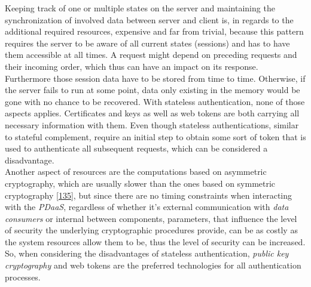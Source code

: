 \documentclass[12pt,english,a4paper,titlepage,cleardoublepage=empty,dottedtoc]{report}
\begin{document}
Keeping track of one or multiple states on the server and maintaining
the synchronization of involved data between server and client is, in
regards to the additional required resources, expensive and far from
trivial, because this pattern requires the server to be aware of all
current states (sessions) and has to have them accessible at all times.
A request might depend on preceding requests and their incoming order,
which thus can have an impact on its response. Furthermore those session
data have to be stored from time to time. Otherwise, if the server fails
to run at some point, data only existing in the memory would be gone
with no chance to be recovered. With stateless authentication, none of
those aspects applies. Certificates and keys as well as web tokens are
both carrying all necessary information with them. Even though stateless
authentications, similar to stateful complement, require an initial step
to obtain some sort of token that is used to authenticate all subsequent
requests, which can be considered a disadvantage.\\
Another aspect of resources are the computations based on asymmetric
cryptography, which are usually slower than the ones based on symmetric
cryptography
{[}\protect\hyperlink{ref-book_2014_chapter-10-5-asym-random-number-gen}{135}{]},
but since there are no timing constraints when interacting with the
\emph{PDaaS}, regardless of whether it's external communication with
\emph{data consumers} or internal between components, parameters, that
influence the level of security the underlying cryptographic procedures
provide, can be as costly as the system resources allow them to be, thus
the level of security can be increased. So, when considering the
disadvantages of stateless authentication, \emph{public key
cryptography} and web tokens are the preferred technologies for all
authentication processes.
\end{document}
